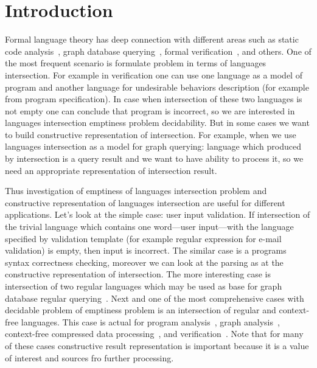 \section{Introduction}

Formal language theory has deep connection with different areas such as static code analysis~\cite{Reps:1995:PID:199448.199462,vardoulakis2010cfa2,Yan:2011:DCA:2001420.2001440,rehof2001type,lu2013incremental, pratikakis2006existential, zhang2017context}, graph database querying~\cite{hellingsRelational, hellingsPathQuerying,zhang2016context, koschmieder2012regular}, formal verification~\cite{!!!}, and others.
One of the most frequent scenario is formulate problem in terms of languages intersection.
For example in verification one can use one language as a model of program and another language for undesirable behaviors description (for example from program specification).
In case when intersection of these two languages is not empty one can conclude that program is incorrect, so we are interested in languages intersection emptiness problem decidability.
But in some cases we want to build constructive representation of intersection. 
For example, when we use languages intersection as a model for graph querying: language which produced by intersection is a query result and we want to have ability to process it, so we need an appropriate representation of intersection result.

Thus investigation of emptiness of languages intersection problem and constructive representation of languages intersection are useful for different applications.
Let's look at the simple case: user input validation. 
If intersection of the trivial language which contains one word---user input---with the language specified by validation template (for example regular expression for e-mail validation) is empty, then input is incorrect. 
The similar case is a programs syntax correctness checking, moreover we can look at the parsing as at the constructive representation of intersection.
The more interesting case is intersection of two regular languages which may be used as base for graph database regular querying~\cite{ABITEBOUL1999428,koschmieder2012regular,alkhateeb:tel-00293206}.
Next and one of the most comprehensive cases with decidable problem of emptiness problem is an intersection of regular and context-free languages.
This case is actual for program analysis~\cite{Reps:1995:PID:199448.199462,vardoulakis2010cfa2,Yan:2011:DCA:2001420.2001440}, graph analysis~\cite{hellingsPathQuerying,zhang2016context,grigorev2016context}, context-free compressed data processing~\cite{MANETH201819}, and verification~\cite{!!!}.
Note that for many of these cases constructive result representation is important because it is a value of interest and sources fro further processing.

